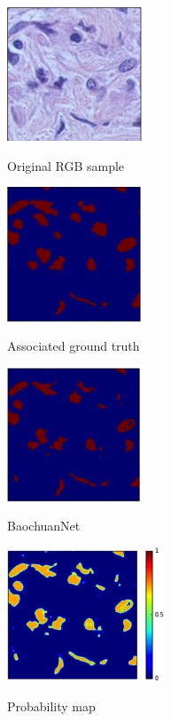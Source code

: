 \documentclass{article}
\begin{document}
\begin{figure}[htb]
\begin{minipage}[b]{.48\linewidth}
  \centering
  \centerline{\includegraphics[height=4.0cm]{RGB_pred}}
  \centerline{Original RGB sample}\medskip
\end{minipage}
\hfill
\begin{minipage}[b]{0.48\linewidth}
  \centering
  \centerline{\includegraphics[width=4.0cm]{GT_pred}}
  \centerline{Associated ground truth}\medskip
\end{minipage}


\begin{minipage}[b]{0.48\linewidth}
  \centering
  \centerline{\includegraphics[height=4.0cm]{BaochuanB}}
  \centerline{BaochuanNet}\medskip
\end{minipage}
\hfill
\begin{minipage}[b]{.48\linewidth}
  \centering
  \centerline{\includegraphics[height=4.0cm]{BaochuanP}}
  \centerline{Probability map}\medskip
\end{minipage}



\end{figure}
\end{document}
